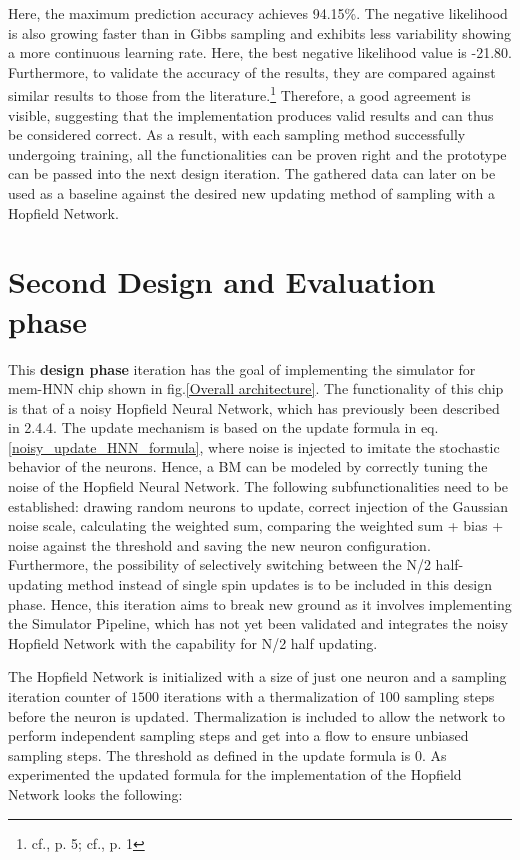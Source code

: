 Here, the maximum prediction accuracy achieves 94.15\%. 
The negative likelihood is also growing faster than in Gibbs sampling and exhibits less variability showing a more continuous learning rate.
Here, the best negative likelihood value is -21.80.
Furthermore, to validate the accuracy of the results, they are compared against similar results to those from the literature.\footnote{cf.\cite{bohmNoiseinjectedAnalogIsing2022a}, p. 5; cf.\cite{RestrictedBoltzmannMachine}, p. 1}
Therefore, a good agreement is visible, suggesting that the implementation produces valid results and can thus be considered correct.
As a result, with each sampling method successfully undergoing training, all the functionalities can be proven right and the prototype can be passed 
into the next design iteration.
The gathered data can later on be used as a baseline against the desired new updating method of sampling with a Hopfield Network.


\section{Second Design and Evaluation phase}

This \textbf{design phase} iteration has the goal of implementing the simulator for \ac{mem-HNN} chip shown in fig.\ref{Overall architecture}.
The functionality of this chip is that of a noisy Hopfield Neural Network, which has previously been described in 2.4.4.
The update mechanism is based on the update formula in eq.\ref{noisy_update_HNN_formula}, where noise is injected to imitate the stochastic behavior of the neurons.
Hence, a \ac{BM} can be modeled by correctly tuning the noise of the Hopfield Neural Network.
The following subfunctionalities need to be established: drawing random neurons to update,
correct injection of the Gaussian noise scale, calculating the weighted sum,
comparing the weighted sum + bias + noise against the threshold and saving the new neuron configuration.
Furthermore, the possibility of selectively switching between the N/2 half-updating method instead of single spin updates
is to be included in this design phase. 
Hence, this iteration aims to break new ground as it involves implementing the Simulator Pipeline, which has not yet been validated and integrates the noisy Hopfield Network with the capability for N/2 half updating.

The Hopfield Network is initialized with a size of just one neuron and a sampling iteration counter of \(1500\) iterations with a thermalization of \(100\) sampling steps before 
the neuron is updated.
Thermalization is included to allow the network to perform independent sampling steps and get into a flow to ensure unbiased sampling steps.
The threshold as defined in the update formula is \(0\). 
As experimented the updated formula for the implementation of the Hopfield Network looks the following:

